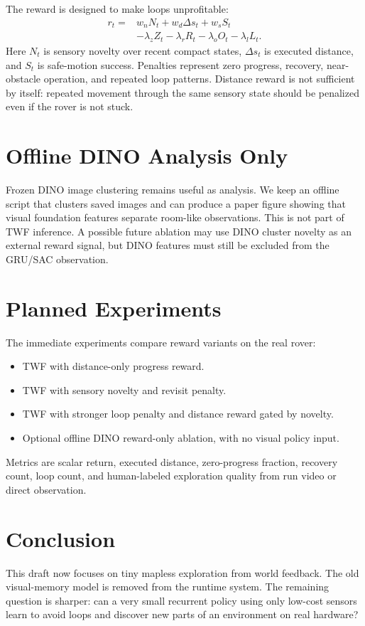 \documentclass{article}
\begin{document}
The reward is designed to make loops unprofitable:
\begin{align}
r_t ={}& w_n N_t + w_d \Delta s_t + w_s S_t \\
&- \lambda_z Z_t - \lambda_r R_t - \lambda_o O_t - \lambda_l L_t.
\end{align}
Here $N_t$ is sensory novelty over recent compact states, $\Delta s_t$ is executed distance, and $S_t$ is safe-motion success. Penalties represent zero progress, recovery, near-obstacle operation, and repeated loop patterns. Distance reward is not sufficient by itself: repeated movement through the same sensory state should be penalized even if the rover is not stuck.

\section{Offline DINO Analysis Only}

Frozen DINO image clustering remains useful as analysis. We keep an offline script that clusters saved images and can produce a paper figure showing that visual foundation features separate room-like observations. This is not part of TWF inference. A possible future ablation may use DINO cluster novelty as an external reward signal, but DINO features must still be excluded from the GRU/SAC observation.

\section{Planned Experiments}

The immediate experiments compare reward variants on the real rover:

\begin{itemize}
  \item TWF with distance-only progress reward.
  \item TWF with sensory novelty and revisit penalty.
  \item TWF with stronger loop penalty and distance reward gated by novelty.
  \item Optional offline DINO reward-only ablation, with no visual policy input.
\end{itemize}

Metrics are scalar return, executed distance, zero-progress fraction, recovery count, loop count, and human-labeled exploration quality from run video or direct observation.

\section{Conclusion}

This draft now focuses on tiny mapless exploration from world feedback. The old visual-memory model is removed from the runtime system. The remaining question is sharper: can a very small recurrent policy using only low-cost sensors learn to avoid loops and discover new parts of an environment on real hardware?



\end{document}
